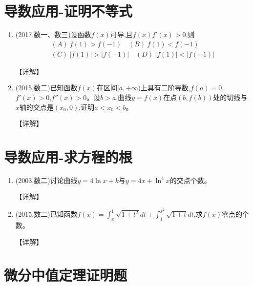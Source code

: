 \documentclass[12pt, a4paper, oneside, UTF8]{ctexbook}
\begin{document}
\section{导数应用-证明不等式}

\begin{enumerate}[label=\arabic*.,start=21]
    \item  (2017,数一、数三)设函数$f(x)$可导,且$f(x)f'(x)>0$,则
    \begin{align*}
        (A)\ f(1)>f(-1) \quad (B)\ f(1)<f(-1) \\
        (C)\ |f(1)|>|f(-1)| \quad (D)\ |f(1)|<|f(-1)|
    \end{align*}
    
    \begin{solution}
    【详解】
    \end{solution}
    
    \item  (2015,数二)已知函数$f(x)$在区间$[a,+\infty)$上具有二阶导数,$f(a)=0$,$f'(x)>0$,$f''(x)>0$。设$b>a$,曲线$y=f(x)$在点$(b,f(b))$处的切线与$x$轴的交点是$(x_0,0)$,证明$a<x_0<b$。
    
    \begin{solution}
    【详解】
    \end{solution}
\end{enumerate}

\section{导数应用-求方程的根}

\begin{enumerate}[label=\arabic*.,start=23]
    \item  (2003,数二)讨论曲线$y=4\ln x+k$与$y=4x+\ln^4 x$的交点个数。
    
    \begin{solution}
    【详解】
    \end{solution}
    
    \item  (2015,数二)已知函数$f(x)=\int_x^1\sqrt{1+t^2}dt+\int_1^{x^2}\sqrt{1+t}dt$,求$f(x)$零点的个数。
    
    \begin{solution}
    【详解】
    \end{solution}
\end{enumerate}

\section{微分中值定理证明题}
\end{document}

